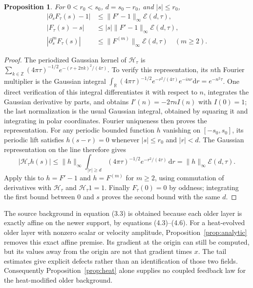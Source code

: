 \documentclass[11pt]{article}
\newtheorem{proposition}{Proposition}
\newcommand{\R}{\mathbb R}
\newcommand{\dd}{\mathrm d}
\newcommand{\Hs}{\mathcal H}
\begin{document}
\begin{proposition}\label{prop:tail}
For $0<r_0<s_0$, $d=s_0-r_0$, and $|s|\leq r_0$,
\begin{align}
 |\partial_sF_\tau(s)-1|&\leq\|F'-1\|_\infty\mathcal E(d,\tau),\label{eq:tail1}\\
 |F_\tau(s)-s|&\leq |s|\|F'-1\|_\infty\mathcal E(d,\tau),\label{eq:tail0}\\
 |\partial_s^mF_\tau(s)|&\leq\|F^{(m)}\|_\infty\mathcal E(d,\tau)
   \quad(m\geq2).\label{eq:tailm}
\end{align}
\end{proposition}
\begin{proof}
The periodized Gaussian kernel of $\Hs_\tau$ is
$\sum_{k\in\mathbb Z}(4\pi\tau)^{-1/2}
e^{-(r+2\pi k)^2/(4\tau)}$. To verify this representation, its $n$th
Fourier multiplier is the Gaussian integral
$\int_{\R}(4\pi\tau)^{-1/2}e^{-r^2/(4\tau)}e^{-inr}\dd r=e^{-n^2\tau}$.
One direct verification of this integral differentiates it with respect
to $n$, integrates the Gaussian derivative by parts, and obtains
$I'(n)=-2\tau n I(n)$ with $I(0)=1$; the last normalization is the usual
Gaussian integral, obtained by squaring it and integrating in polar
coordinates. Fourier uniqueness then proves the representation.
For any periodic bounded function $h$ vanishing on $[-s_0,s_0]$, its
periodic lift satisfies $h(s-r)=0$ whenever $|s|\leq r_0$ and $|r|<d$.
The Gaussian representation on the line therefore gives
\[
 |\Hs_\tau h(s)|\leq
 \|h\|_\infty\int_{|r|\geq d}
 (4\pi\tau)^{-1/2}e^{-r^2/(4\tau)}\,\dd r
 =\|h\|_\infty\mathcal E(d,\tau).
\]
Apply this to $h=F'-1$ and $h=F^{(m)}$ for $m\geq2$, using commutation
of derivatives with $\Hs_\tau$ and $\Hs_\tau1=1$.
Finally $F_\tau(0)=0$ by oddness; integrating the first bound between
$0$ and $s$ proves the second bound with the same $d$.
\end{proof}

The source background in equation (3.3) is obtained because each older
layer is exactly affine on the newer support, by equations (4.3)--(4.6).
For a heat-evolved older layer with nonzero scalar or velocity amplitude,
Proposition~\ref{prop:analytic} removes this exact affine premise.
Its gradient at the origin can still be computed, but its values away
from the origin are not that gradient times $x$. The tail estimates give
explicit defects rather than an identification of those two fields.
Consequently Proposition~\ref{prop:heat} alone supplies no coupled feedback
law for the heat-modified older background.
\end{document}
